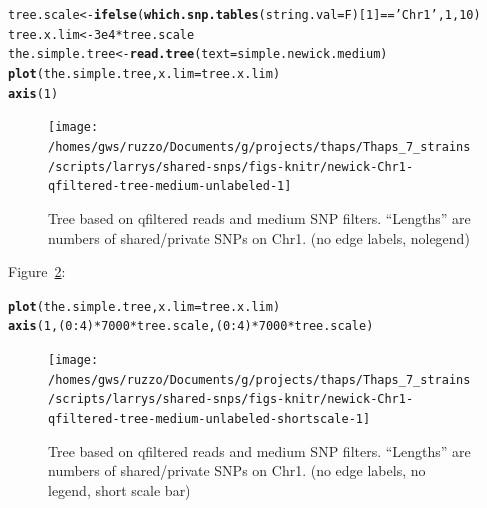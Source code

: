 \documentclass{article}\usepackage[]{graphicx}\usepackage[]{color}
\makeatletter
\newcommand{\hlnum}[1]{\textcolor[rgb]{0.686,0.059,0.569}{#1}}%
\newcommand{\hlstr}[1]{\textcolor[rgb]{0.192,0.494,0.8}{#1}}%
\newcommand{\hlopt}[1]{\textcolor[rgb]{0,0,0}{#1}}%
\newcommand{\hlstd}[1]{\textcolor[rgb]{0.345,0.345,0.345}{#1}}%
\newcommand{\hlkwb}[1]{\textcolor[rgb]{0.69,0.353,0.396}{#1}}%
\newcommand{\hlkwc}[1]{\textcolor[rgb]{0.333,0.667,0.333}{#1}}%
\newcommand{\hlkwd}[1]{\textcolor[rgb]{0.737,0.353,0.396}{\textbf{#1}}}%
\newenvironment{kframe}{%
 \def\at@end@of@kframe{}%
 \ifinner\ifhmode%
  \def\at@end@of@kframe{\end{minipage}}%
  \begin{minipage}{\columnwidth}%
 \fi\fi%
 \def\FrameCommand##1{\hskip\@totalleftmargin \hskip-\fboxsep
 \colorbox{shadecolor}{##1}\hskip-\fboxsep
     \hskip-\linewidth \hskip-\@totalleftmargin \hskip\columnwidth}%
 \MakeFramed {\advance\hsize-\width
   \@totalleftmargin\z@ \linewidth\hsize
   \@setminipage}}%
 {\par\unskip\endMakeFramed%
 \at@end@of@kframe}
\newenvironment{knitrout}{}{} %
\makeatother
\begin{document}
\begin{knitrout}\scriptsize
{}\color{fgcolor}\begin{kframe}
\begin{alltt}
\hlstd{tree.scale} \hlkwb{<-} \hlkwd{ifelse}\hlstd{(}\hlkwd{which.snp.tables}\hlstd{(}\hlkwc{string.val}\hlstd{=F)[}\hlnum{1}\hlstd{]}\hlopt{==}\hlstr{'Chr1'}\hlstd{,} \hlnum{1}\hlstd{,} \hlnum{10}\hlstd{)}
\hlstd{tree.x.lim} \hlkwb{<-} \hlnum{3e4} \hlopt{*} \hlstd{tree.scale}
\hlstd{the.simple.tree} \hlkwb{<-} \hlkwd{read.tree}\hlstd{(}\hlkwc{text}\hlstd{=simple.newick.medium)}
\hlkwd{plot}\hlstd{(the.simple.tree,} \hlkwc{x.lim} \hlstd{= tree.x.lim)}
\hlkwd{axis}\hlstd{(}\hlnum{1}\hlstd{)}
\end{alltt}
\end{kframe}\begin{figure}

{\centering \texttt{[image: /homes/gws/ruzzo/Documents/g/projects/thaps/Thaps\_7\_strains/scripts/larrys/shared-snps/figs-knitr/newick-Chr1-qfiltered-tree-medium-unlabeled-1]} 

}

\caption[Tree based on qfiltered reads and medium SNP filters]{Tree based on qfiltered reads and medium SNP filters.  ``Lengths'' are numbers of shared/private SNPs on Chr1. (no edge labels, nolegend)}\label{fig:tree-medium-unlabeled}
\end{figure}


\end{knitrout}

Figure~\ref{fig:tree-medium-unlabeled-shortscale}:

\begin{knitrout}\scriptsize
{}\color{fgcolor}\begin{kframe}
\begin{alltt}
\hlkwd{plot}\hlstd{(the.simple.tree,} \hlkwc{x.lim} \hlstd{= tree.x.lim)}
\hlkwd{axis}\hlstd{(}\hlnum{1}\hlstd{,(}\hlnum{0}\hlopt{:}\hlnum{4}\hlstd{)}\hlopt{*}\hlnum{7000}\hlopt{*}\hlstd{tree.scale,(}\hlnum{0}\hlopt{:}\hlnum{4}\hlstd{)}\hlopt{*}\hlnum{7000}\hlopt{*}\hlstd{tree.scale)}
\end{alltt}
\end{kframe}\begin{figure}

{\centering \texttt{[image: /homes/gws/ruzzo/Documents/g/projects/thaps/Thaps\_7\_strains/scripts/larrys/shared-snps/figs-knitr/newick-Chr1-qfiltered-tree-medium-unlabeled-shortscale-1]} 

}

\caption[Tree based on qfiltered reads and medium SNP filters]{Tree based on qfiltered reads and medium SNP filters.  ``Lengths'' are numbers of shared/private SNPs on Chr1. (no edge labels, no legend, short scale bar)}\label{fig:tree-medium-unlabeled-shortscale}
\end{figure}


\end{knitrout}
\end{document}
